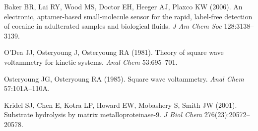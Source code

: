 \documentclass[10pt,a4paper]{article}
\numberwithin{equation}{section}
\begin{document}
\begin{enumerate}[label={[\arabic*]},noitemsep,leftmargin=*]
\item Baker BR, Lai RY, Wood MS, Doctor EH, Heeger AJ, Plaxco KW (2006).
  An electronic, aptamer-based small-molecule sensor for the rapid,
  label-free detection of cocaine in adulterated samples and biological
  fluids. \textit{J Am Chem Soc} 128:3138--3139.

\item O'Dea JJ, Osteryoung J, Osteryoung RA (1981). Theory of square wave
  voltammetry for kinetic systems. \textit{Anal Chem} 53:695--701.

\item Osteryoung JG, Osteryoung RA (1985). Square wave voltammetry.
  \textit{Anal Chem} 57:101A--110A.

\item Kridel SJ, Chen E, Kotra LP, Howard EW, Mobashery S, Smith JW
  (2001). Substrate hydrolysis by matrix metalloproteinase-9.
  \textit{J Biol Chem} 276(23):20572--20578.
\end{enumerate}
\end{document}
